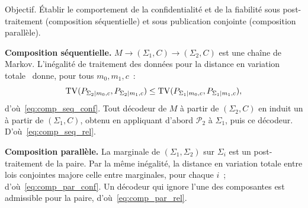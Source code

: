 \begin{sloppypar}
\begin{Preuve}
\begin{cmtEtape}{Objectif.}
\'Etablir le comportement de la confidentialit\'e et de la fiabilit\'e sous
post-traitement (composition s\'equentielle) et sous publication conjointe
(composition parall\`ele).
\end{cmtEtape}

\textbf{Composition s\'equentielle.}
$M \to (\Sigma_1,C) \to (\Sigma_2,C)$ est une cha\^ine de Markov.
L'in\'egalit\'e de traitement des donn\'ees pour la distance en variation
totale~\cite{CoverThomas06} donne, pour tous $m_0, m_1, c$~:
\begin{equation}
\operatorname{TV}(P_{\Sigma_2|m_0,c}, P_{\Sigma_2|m_1,c}) \leq \operatorname{TV}(P_{\Sigma_1|m_0,c}, P_{\Sigma_1|m_1,c}),
\end{equation}
d'o\`u~\eqref{eq:comp_seq_conf}. Tout d\'ecodeur de $M$ \`a partir de
$(\Sigma_2,C)$ en induit un \`a partir de $(\Sigma_1,C)$, obtenu en appliquant d'abord
$\mathcal{P}_2$ \`a $\Sigma_1$, puis ce d\'ecodeur. D'o\`u~\eqref{eq:comp_seq_rel}.

\textbf{Composition parall\`ele.}
La marginale de $(\Sigma_1,\Sigma_2)$ sur $\Sigma_i$ est un post-traitement
de la paire. Par la m\^eme in\'egalit\'e, la distance en variation totale
entre lois conjointes majore celle entre marginales, pour chaque $i$~;
d'o\`u~\eqref{eq:comp_par_conf}. Un d\'ecodeur qui ignore l'une des
composantes est admissible pour la paire, d'o\`u~\eqref{eq:comp_par_rel}.
\end{Preuve}


\end{sloppypar}
